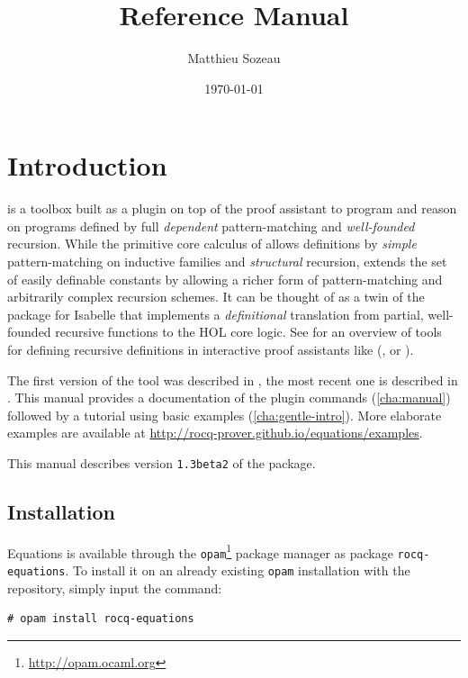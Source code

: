 \documentclass{report}
\author{Matthieu Sozeau}
\date{\today}
\title{\Equations \eqnversion Reference Manual}
\def\eqnversion{\texttt{1.3beta2}\xspace}
\begin{document}
\maketitle

\def\coqlibrary#1#2#3{}

\def\Equations{\texorpdfstring{\name{Equations}}{Equations}}

\chapter*{Introduction}
\label{cha:introduction}

\Equations is a toolbox built as a plugin on top of the \Coq proof assistant
to program and reason on programs defined by full \emph{dependent}
pattern-matching and \emph{well-founded} recursion. While the primitive
core calculus of \Coq allows definitions by \emph{simple} pattern-matching on
inductive families and \emph{structural} recursion, \Equations extends
the set of easily definable constants by allowing a richer form of
pattern-matching and arbitrarily complex recursion schemes. It can be
thought of as a twin of the  package for Isabelle that
implements a \emph{definitional} translation from partial, well-founded
recursive functions to the HOL core logic. See
\cite{BoveKraussSozeau2011} for an overview of tools for defining
recursive definitions in interactive proof assistants like (\Coq, \Agda
or \Isabelle).

The first version of the tool was described in
\cite{sozeau.Coq/Equations/ITP10}, the most recent one is described in
\cite{equationsreloaded}. This manual provides a documentation of the plugin
commands (\autoref{cha:manual}) followed by a tutorial using basic
examples (\autoref{cha:gentle-intro}).  More elaborate examples are
available at \url{http://rocq-prover.github.io/equations/examples}.

This manual describes version \eqnversion of the package.

\section*{Installation}

Equations is available through the
\texttt{opam}\footnote{\url{http://opam.ocaml.org}} package manager as
package \texttt{rocq-equations}. To install it on an already existing
\texttt{opam} installation with the \Coq repository, simply input the
command:
\begin{verbatim}
# opam install rocq-equations
\end{verbatim}
\end{document}
